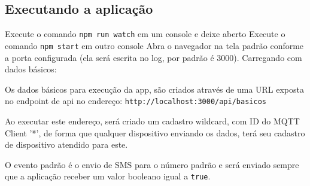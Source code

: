 \subsection{Executando a aplicação}

Execute o comando \verb|npm run watch| em um console e deixe aberto
Execute o comando \verb|npm start| em outro console
Abra o navegador na tela padrão conforme a porta configurada (ela será escrita no log, por padrão é 3000).
Carregando com dados básicos:

Os dados básicos para execução da app, são criados através de uma URL exposta no endpoint de api no endereço: \verb|http://localhost:3000/api/basicos|

Ao executar este endereço, será criado um cadastro wildcard, com ID do MQTT Client '*', de forma que qualquer dispositivo enviando os dados, terá seu cadastro de dispositivo atendido para este.

O evento padrão é o envio de SMS para o número padrão e será enviado sempre que a aplicação receber um valor booleano igual a \verb|true|.